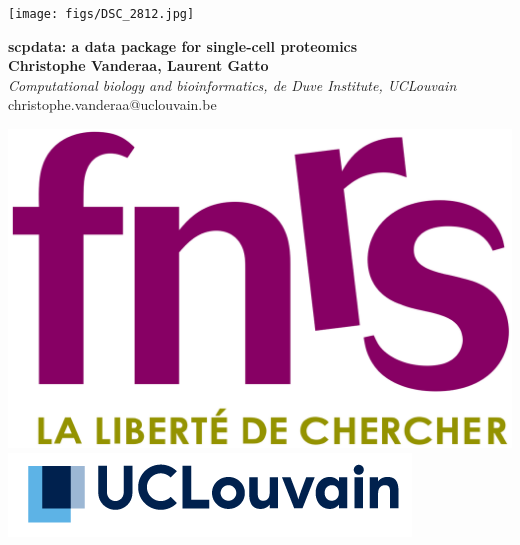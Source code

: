 \documentclass{article}
\title{}
\author{}
\date{}
\begin{document}


\begin{center}
\colorbox{lgray}{
  \begin{minipage}{3cm}
    
    \texttt{[image: figs/DSC\_2812.jpg]}
  \end{minipage}
  \begin{minipage}{.74\textwidth}
    \begin{center}
      \huge \textbf{scpdata: a data package for single-cell proteomics} \\
      \vspace{0.4cm}
      \Large \textbf{Christophe Vanderaa, Laurent Gatto} \\
      \Large \textit{Computational biology and bioinformatics, de Duve Institute, UCLouvain } \\
      \vspace{0.4cm}
      \normalsize christophe.vanderaa@uclouvain.be \\
    \end{center}
  \end{minipage}
  \begin{minipage}{3.7cm}
      \includegraphics[width=0.7\linewidth, right]{figs/fnrs.png} \\
      \vspace{0.5cm}
      \includegraphics[width=1.1\linewidth, right]{figs/ucl.png}
  \end{minipage}
}
\end{center}
\end{document}

